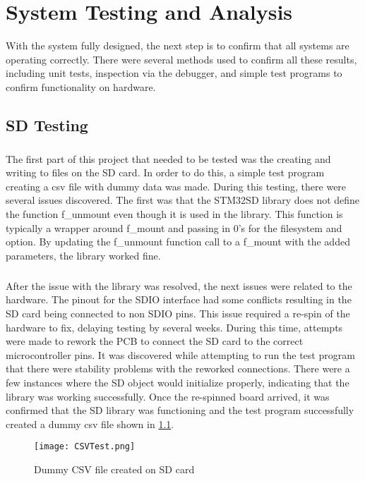 \chapter{System Testing and Analysis}
With the system fully designed, the next step is to confirm that all systems are operating correctly.
There were several methods used to confirm all these results, including unit tests, inspection via the debugger, and simple test programs to confirm functionality on hardware.

\section{SD Testing}

\paragraph{}
The first part of this project that needed to be tested was the creating and writing to files on the SD card.
In order to do this, a simple test program creating a csv file with dummy data was made.
During this testing, there were several issues discovered.
The first was that the STM32SD library does not define the function f\_unmount even though it is used in the library.
This function is typically a wrapper around f\_mount and passing in 0's for the filesystem and option.
By updating the f\_unmount function call to a f\_mount with the added parameters, the library worked fine.

\paragraph{}
After the issue with the library was resolved, the next issues were related to the hardware.
The pinout for the SDIO interface had some conflicts resulting in the SD card being connected to non SDIO pins.
This issue required a re-spin of the hardware to fix, delaying testing by several weeks.
During this time, attempts were made to rework the PCB to connect the SD card to the correct microcontroller pins.
It was discovered while attempting to run the test program that there were stability problems with the reworked connections.
There were a few instances where the SD object would initialize properly, indicating that the library was working successfully.
Once the re-spinned board arrived, it was confirmed that the SD library was functioning and the test program successfully created a dummy csv file shown in \cref{fig:CSVTest}.

\begin{figure}[H]
	\centering
	\texttt{[image: CSVTest.png]}
	\caption{Dummy CSV file created on SD card}
	\label{fig:CSVTest}
\end{figure}

